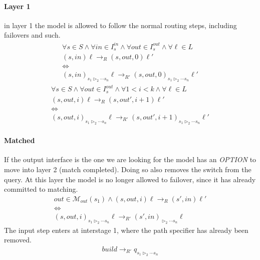\documentclass[preview]{standalone}
\begin{document}
\paragraph{Layer 1} in layer 1 the model is allowed to follow the normal
routing steps, including failovers and such.
\begin{gather*}
	\forall s \in S \wedge \forall in \in I^{in}_s \wedge \forall out \in I^{out}_s \wedge \forall \ell \in L \\
	(s, in)\ell \to_R (s, out, 0)\ell'
	\\
	\iff
	\\
	{(s, in)}_{s_1 \triangleright_2 \dotsb s_n}\ell \to_{R'}
		{(s, out, 0)}_{s_1 \triangleright_2 \dotsb s_n}\ell'
\end{gather*}
\begin{gather*}
	\forall s \in S \wedge \forall out \in I^{out}_s \wedge \forall 1<i<k \wedge \forall \ell \in L \\
	(s, out, i)\ell \to_R (s, out', i+1)\ell'
	\\
	\iff
	\\
	{(s, out, i)}_{s_1 \triangleright_2 \dotsb s_n}\ell \to_{R'}
		{(s, out', i+1)}_{s_1 \triangleright_2 \dotsb s_n}\ell'
\end{gather*}
\paragraph{Matched} If the output interface is the one we are looking
for the model has an \emph{OPTION} to move into layer 2 (match
completed). Doing so also removes the switch from the query. At this
layer the model is no longer allowed to failover, since it has already
committed to matching.
\begin{gather*}
	out \in \mathcal{M}_{out}(s_1) \wedge (s, out, i)\ell \to_R (s', in)\ell' \\
	\iff \\
	{(s, out, i)}_{s_1 \triangleright_2 \dotsb s_n}\ell \to_{R'}
		{(s', in)}_{\triangleright_2 \dotsb s_n}\ell
\end{gather*}
The input step enters at interstage 1, where the path specifier has
already been removed.
\begin{gather*}
	build \to_{R'}
		q_{s_1 \triangleright_2 \dotsb s_n}
\end{gather*}
\end{document}

